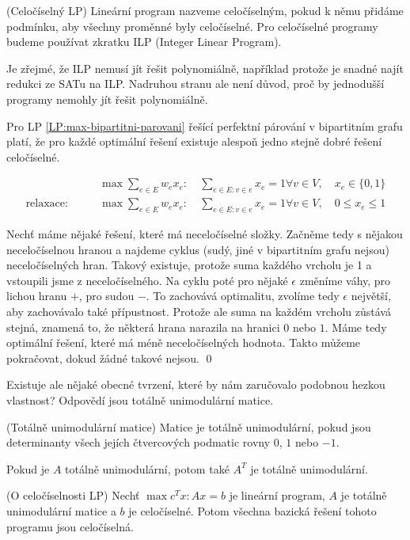 \label{LP:celociselnost}
\df (Celočíselný LP) Lineární program nazveme celočíselným, pokud k němu přidáme
podmínku, aby všechny proměnné byly celočíselné. Pro celočíselné programy budeme
používat zkratku ILP (Integer Linear Program).

Je zřejmé, že ILP nemusí jít řešit polynomiálně, například protože je snadné
najít redukci ze SATu na ILP. Nadruhou stranu ale není důvod, proč by jednodušší
programy nemohly jít řešit polynomiálně. 

\tv Pro LP \eqref{LP:max-bipartitni-parovani} řešící perfektní párování v bipartitním grafu platí, že pro každé
optimální řešení existuje alespoň jedno stejně dobré řešení celočíselné.

\begin{align}
\label{LP:max-bipartitni-parovani}
&\max \sum_{e \in E} w_e x_e: \quad \sum_{e \in E: v \in e} x_e = 1 \forall v
	\in V, \quad x_e \in \{0, 1\} \\
	\text{relaxace:}\qquad	&\max \sum_{e \in E} w_e x_e: \quad \sum_{e \in E: v \in e} x_e = 1 \forall v
	\in V, \quad 0 \leq x_e \leq 1
\end{align}

\dk Nechť máme nějaké řešení, které má neceločíselné
složky. Začněme tedy s nějakou neceločíselnou hranou a najdeme cyklus (sudý,
jiné v bipartitním grafu nejsou) neceločíselných hran. Takový existuje, protože
suma každého vrcholu je 1 a vstoupili jsme z neceločíselného. Na cyklu poté pro
nějaké $\epsilon$ změníme váhy, pro lichou hranu $+$, pro sudou $-$. To
zachovává optimalitu, zvolíme tedy $\epsilon$ největší, aby zachovávalo také
přípustnost. Protože ale suma na každém vrcholu zůstává stejná, znamená to, že
některá hrana narazila na hranici $0$ nebo $1$. Máme tedy optimální řešení,
které má méně neceločíselných hodnota. Takto můžeme pokračovat, dokud žádné
takové nejsou. \qed

Existuje ale nějaké obecné tvrzení, které by nám zaručovalo podobnou hezkou
vlastnost? Odpovědí jsou totálně unimodulární matice.

\df (Totálně unimodulární matice) Matice je totálně unimodulární, pokud jsou
determinanty všech jejích čtvercových podmatic rovny $0$, $1$ nebo $-1$.

\poz Pokud je $A$ totálně unimodulární, potom také $A^T$ je totálně
unimodulární.

\vt (O celočíselnosti LP) Nechť $\max c^Tx : Ax = b$ je lineární program, $A$ je totálně
unimodulární matice a $b$ je celočíselné. Potom všechna bazická řešení tohoto
programu jsou celočíselná.

